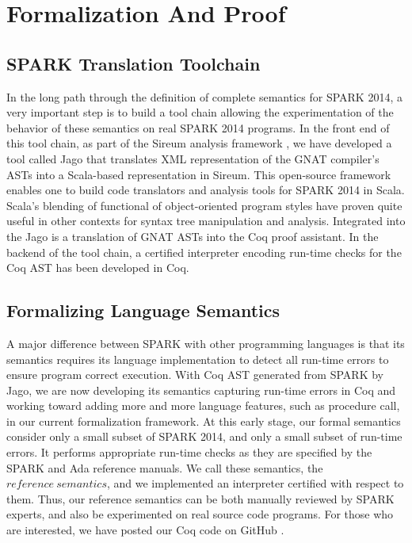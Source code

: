 \section{Formalization And Proof}

\subsection{SPARK Translation Toolchain}
In the long path through the definition of complete semantics for
SPARK 2014, a very important step is to build a tool chain allowing 
the experimentation of the behavior of these semantics on real SPARK
2014 programs. In the front end of this tool chain, as part of the 
Sireum analysis framework \cite{Sireum:URL}, we have developed a tool called Jago
\cite{Jago:URL} that translates XML representation of the GNAT compiler's 
ASTs into a Scala-based 
representation in Sireum.  This open-source framework enables one to build
code translators and analysis tools for SPARK 2014 in Scala.  Scala's 
blending of functional of object-oriented program styles have proven 
quite useful in other contexts for syntax tree manipulation and analysis.  
Integrated into the Jago is a translation of GNAT ASTs into the Coq proof 
assistant. In the backend of the tool chain, a certified interpreter 
encoding run-time checks for the Coq AST has been developed in Coq.

\subsection{Formalizing Language Semantics}
A major difference between SPARK with other programming languages is that 
its semantics requires its language implementation to detect all run-time errors to 
ensure program correct execution. With Coq AST generated from SPARK by Jago, we 
are now developing its semantics capturing run-time errors in Coq and working toward 
adding more and more language features, such as procedure call, in our current 
formalization framework.
At this early stage, our formal semantics consider only a small subset
of SPARK 2014, and only a small subset of run-time errors.  It performs 
appropriate run-time checks as they are specified by the SPARK and Ada 
reference manuals.  We call these semantics, the $\mathit{reference\
semantics}$, and we implemented an interpreter certified with respect to them.
Thus, our reference semantics can be both manually reviewed by SPARK 
experts, and also be experimented on real source code programs.
For those who are interested, we have posted our Coq code on GitHub 
\cite{Formalization:URL}.

